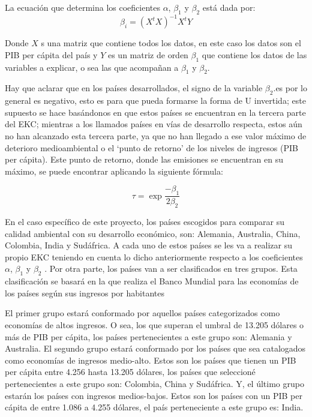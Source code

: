\documentclass[11 pt]{article}
\begin{document}
La ecuación que determina los coeficientes $\alpha$, $\beta_1$ y  $\beta_2$ está dada por:
\begin{equation}\label{eq:mco}
\beta_{i} = (X^tX)^{-1} X^tY
\end{equation}

Donde $X$ s una matriz que contiene todos los datos, en este caso los datos son el PIB per
cápita del país y $Y$ es un matriz de orden $\beta_1$ que contiene los datos de las variables a
explicar, o sea las que acompañan a $\beta_1$ y  $\beta_2$.

Hay que aclarar que en los países desarrollados, el signo de la variable $\beta_2$.es por lo general es negativo, esto es para que pueda formarse la forma de U invertida; este supuesto se hace basándonos en que estos países se encuentran en la tercera parte del EKC; mientras a los llamados países en vías de desarrollo respecta, estos aún no han alcanzado esta tercera parte, ya que no han llegado a ese valor máximo de deterioro medioambiental o el ‘punto de retorno’ de los niveles de ingresos (PIB per cápita). Este punto de retorno, donde las emisiones se encuentran en su máximo, se puede encontrar aplicando la siguiente fórmula:

\begin{equation}
\tau = \exp{\frac{-\beta_1}{2\beta_2}}
\end{equation}

En el caso específico de este proyecto, los países escogidos para comparar su calidad ambiental con su desarrollo económico, son: Alemania, Australia, China, Colombia, India y Sudáfrica. A cada uno de estos países se les va a realizar su propio EKC teniendo en cuenta lo dicho anteriormente respecto a los coeficientes  $\alpha$, $\beta_1$ y  $\beta_2$ . Por otra parte, los países van a ser clasificados en tres grupos. Esta clasificación se basará en la que realiza el Banco Mundial para las economías de los países según sus ingresos por habitantes

El primer grupo estará conformado por aquellos países categorizados como economías de altos ingresos. O sea, los que superan el umbral de 13.205 dólares o más de PIB per cápita, los países pertenecientes a este grupo son: Alemania y  Australia. El segundo grupo estará conformado por los países que sea catalogados como economías de ingresos medio-alto. Estos son los países que tienen un PIB per cápita entre 4.256 hasta 13.205 dólares, los países que seleccioné pertenecientes a este grupo son: Colombia, China y Sudáfrica. Y, el último grupo estarán los países con ingresos medios-bajos. Estos son los países con un PIB per cápita de entre 1.086 a 4.255 dólares, el país perteneciente a este grupo es: India. ~\cite{wb}
\end{document}
